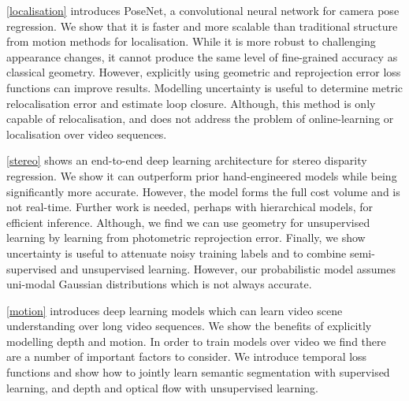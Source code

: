 \cref{localisation} introduces PoseNet, a convolutional neural network for camera pose regression. We show that it is faster and more scalable than traditional structure from motion methods for localisation. While it is more robust to challenging appearance changes, it cannot produce the same level of fine-grained accuracy as classical geometry. However, explicitly using geometric and reprojection error loss functions can improve results. Modelling uncertainty is useful to determine metric relocalisation error and estimate loop closure. Although, this method is only capable of relocalisation, and does not address the problem of online-learning or localisation over video sequences.

\cref{stereo} shows an end-to-end deep learning architecture for stereo disparity regression. We show it can outperform prior hand-engineered models while being significantly more accurate. However, the model forms the full cost volume and is not real-time. Further work is needed, perhaps with hierarchical models, for efficient inference. Although, we find we can use geometry for unsupervised learning by learning from photometric reprojection error. Finally, we show uncertainty is useful to attenuate noisy training labels and to combine semi-supervised and unsupervised learning. However, our probabilistic model assumes uni-modal Gaussian distributions which is not always accurate.

\cref{motion} introduces deep learning models which can learn video scene understanding over long video sequences. We show the benefits of explicitly modelling depth and motion. In order to train models over video we find there are a number of important factors to consider. We introduce temporal loss functions and show how to jointly learn semantic segmentation with supervised learning, and depth and optical flow with unsupervised learning.


